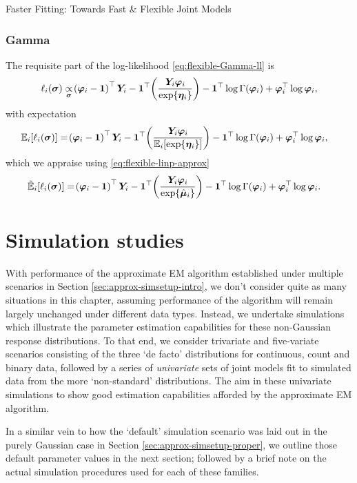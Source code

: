 \begin{chapter}{\label{cha:flexible}Faster Fitting: Towards Fast \& Flexible Joint Models}
\subsubsection{Gamma}
The requisite part of the log-likelihood \eqref{eq:flexible-Gamma-ll} is
\begin{align*}
    \ell_i\!\left(\bm{\sigma}\right)\underset{\bm{\sigma}}{\propto}\!\left(\bm{\varphi}_i-\bm{1}\right)^\top\bm{Y}_i-\bm{1}^\top\!\left(\frac{\bm{Y}_i\bm{\varphi}_i}{\exp\!\left\{\bm{\eta}_i\right\}}\right)-\bm{1}^\top\log\Gamma\!\left(\bm{\varphi}_i\right)+\bm{\varphi}_i^\top\log\bm{\varphi}_i,
\end{align*}
with expectation
\begin{align*}
    \mathbb{E}_i\!\left[\ell_i\!\left(\bm{\sigma}\right)\right]&=\!\left(\bm{\varphi}_i-\bm{1}\right)^\top\bm{Y}_i-\bm{1}^\top\!\left(\frac{\bm{Y}_i\bm{\varphi}_i}{\mathbb{E}_i\!\left[\exp\!\left\{\bm{\eta}_i\right\}\right]}\right)-\bm{1}^\top\log\Gamma\!\left(\bm{\varphi}_i\right)+\bm{\varphi}_i^\top\log\bm{\varphi}_i,
\end{align*}
which we appraise using \eqref{eq:flexible-linp-approx}
\begin{equation}
    \begin{aligned}
        \tilde{\mathbb{E}}_i\!\left[\ell_i\!\left(\bm{\sigma}\right)\right]&=\!\left(\bm{\varphi}_i-\bm{1}\right)^\top\bm{Y}_i-\bm{1}^\top\!\left(\frac{\bm{Y}_i\bm{\varphi}_i}{\exp\!\left\{\hat{\bm{\mu}}_i\right\}}\right)-\bm{1}^\top\log\Gamma\!\left(\bm{\varphi}_i\right)+\bm{\varphi}_i^\top\log\bm{\varphi}_i.
    \end{aligned}
\label{eq:flexible-Mstep-sigma-Gamma}
\end{equation}
\resettocmain
\section{Simulation studies}\label{sec:flexible-simsetup-intro}
With performance of the approximate EM algorithm established under multiple scenarios in Section \ref{sec:approx-simsetup-intro}, we don't consider quite as many situations in this chapter, assuming performance of the algorithm will remain largely unchanged under different data types. Instead, we undertake simulations which illustrate the parameter estimation capabilities for these non-Gaussian response distributions. To that end, we consider trivariate and five-variate scenarios consisting of the three `de facto' distributions for continuous, count and binary data, followed by a series of \textit{univariate} sets of joint models fit to simulated data from the more `non-standard' distributions. The aim in these univariate simulations to show good estimation capabilities afforded by the approximate EM algorithm.

In a similar vein to how the `default' simulation scenario was laid out in the purely Gaussian case in Section \ref{sec:approx-simsetup-proper}, we outline those default parameter values in the next section; followed by a brief note on the actual simulation procedures used for each of these families.


\end{chapter}
